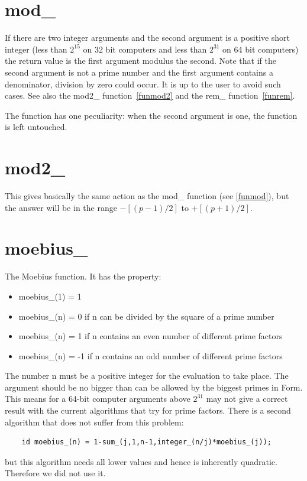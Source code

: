 \section{mod\_}
\label{funmod}
\noindent If there are two integer arguments and the second 
argument is a positive short integer (less than $2^{15}$ on 32 bit 
computers and less than $2^{31}$ on 64 bit computers) the return value is 
the first argument modulus the second. Note that if the second argument is 
not a prime number and the first argument contains a denominator, division 
by zero could occur. It is up to the user to avoid such cases. See also the 
mod2\_ function~\ref{funmod2} and the rem\_ function~\ref{funrem}.

The function has one peculiarity: when the second argument is one, the 
function is left untouched.


\section{mod2\_}
\label{funmod2}
\noindent This gives basically the same action as the mod\_ function (see 
\ref{funmod}), but the answer will be in the range $-[(p-1)/2]$ to 
$+[(p+1)/2]$.


\section{moebius\_}
\label{funmoebius}
\noindent The Moebius function. It has the property:
\begin{itemize}
\item moebius\_(1) = 1
\item moebius\_(n) = 0 if n can be divided by the square of a prime number
\item moebius\_(n) = 1 if n contains an even number of different prime factors
\item moebius\_(n) = -1 if n contains an odd number of different prime factors
\end{itemize}
The number n must be a positive integer for the evaluation to take place. 
The argument should be no bigger than can be allowed by the biggest primes 
in Form. This means for a 64-bit computer arguments above $2^{31}$ may not 
give a correct result with the current algorithms that try for prime 
factors. There is a second algorithm that does not suffer from this 
problem:
\begin{verbatim}
    id moebius_(n) = 1-sum_(j,1,n-1,integer_(n/j)*moebius_(j));
\end{verbatim}
but this algorithm needs all lower values and hence is inherently 
quadratic. Therefore we did not use it.

